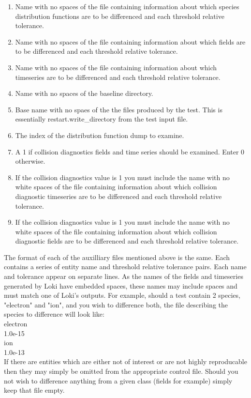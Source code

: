 \documentclass[11pt]{amsart}
\begin{document}
\begin{enumerate}
\item Name with no spaces of the file containing information about which species
distribution functions are to be differenced and each threshold relative
tolerance.
\item Name with no spaces of the file containing information about which fields
are to be differenced and each threshold relative tolerance.
\item Name with no spaces of the file containing information about which
timeseries are to be differenced and each threshold relative tolerance.
\item Name with no spaces of the baseline directory.
\item Base name with no spaes of the the files produced by the test.  This is
essentially restart.write\_directory from the test input file.
\item The index of the distribution function dump to examine.
\item A 1 if collision diagnostics fields and time series should be examined.
Enter 0 otherwise.
\item If the collision diagnostics value is 1 you must include the name with no
white spaces of the file containing information about which collision diagnostic
timeseries are to be differenced and each threshold relative tolerance.
\item If the collision diagnostics value is 1 you must include the name with no
white spaces of the file containing information about which collision diagnostic
fields are to be differenced and each threshold relative tolerance.
\end{enumerate}

The format of each of the auxilliary files mentioned above is the same.  Each
contains a series of entity name and threshold relative tolerance pairs.  Each
name and tolerance appear on separate lines.  As the names of the fields and
timeseries generated by Loki have embedded spaces, these names may include
spaces and must match one of Loki's outputs.  For example, should a test contain
2 species, "electron" and "ion", and you wish to difference both, the file
describing the species to difference will look like: \\
electron \\
1.0e-15 \\
ion \\
1.0e-13 \\
If there are entities which are either not of interest or are not highly
reproducable then they may simply be omitted from the appropriate control file.
Should you not wish to difference anything from a given class (fields for
example) simply keep that file empty.
\end{document}
